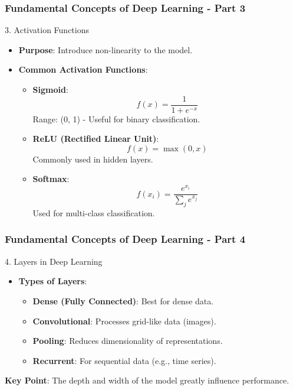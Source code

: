 \documentclass[aspectratio=169]{beamer}
\begin{document}
\begin{frame}[fragile]
    \frametitle{Fundamental Concepts of Deep Learning - Part 3}
    \begin{block}{3. Activation Functions}
        \begin{itemize}
            \item \textbf{Purpose}: Introduce non-linearity to the model.
            \item \textbf{Common Activation Functions}:
                \begin{itemize}
                    \item \textbf{Sigmoid}:
                    \begin{equation}
                        f(x) = \frac{1}{1 + e^{-x}}
                    \end{equation}
                    Range: (0, 1) - Useful for binary classification.
                    
                    \item \textbf{ReLU (Rectified Linear Unit)}:
                    \begin{equation}
                        f(x) = \max(0, x)
                    \end{equation}
                    Commonly used in hidden layers.

                    \item \textbf{Softmax}:
                    \begin{equation}
                        f(x_i) = \frac{e^{x_i}}{\sum_{j} e^{x_j}}
                    \end{equation}
                    Used for multi-class classification.
                \end{itemize}
        \end{itemize}
    \end{block}
\end{frame}

\begin{frame}[fragile]
    \frametitle{Fundamental Concepts of Deep Learning - Part 4}
    \begin{block}{4. Layers in Deep Learning}
        \begin{itemize}
            \item \textbf{Types of Layers}:
                \begin{itemize}
                    \item \textbf{Dense (Fully Connected)}: Best for dense data.
                    \item \textbf{Convolutional}: Processes grid-like data (images).
                    \item \textbf{Pooling}: Reduces dimensionality of representations.
                    \item \textbf{Recurrent}: For sequential data (e.g., time series).
                \end{itemize}
        \end{itemize}
        \textbf{Key Point}: The depth and width of the model greatly influence performance.
    \end{block}
\end{frame}
\end{document}
